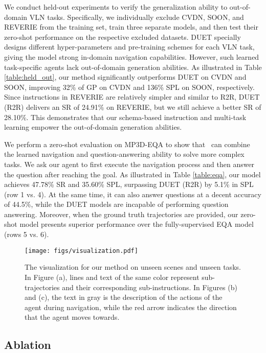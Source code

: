 We conduct held-out experiments to verify the generalization ability to out-of-domain VLN tasks. 
Specifically, we individually exclude CVDN, SOON, and REVERIE from the training set, train three separate models, and then test their zero-shot performance on the respective excluded datasets.
DUET specially designs different hyper-parameters and pre-training schemes for each VLN task, giving the model strong in-domain navigation capabilities. However, such learned task-specific agents lack out-of-domain generation abilities. As illustrated in Table \ref{table:held_out}, our method significantly outperforms DUET on CVDN and SOON, improving 32\% of GP on CVDN and 136\% SPL on SOON, respectively. Since instructions in REVERIE are relatively simpler and similar to R2R, DUET (R2R) delivers an SR of 24.91\% on REVERIE, but we still achieve a better SR of 28.10\%. 
This demonstrates that our schema-based instruction and multi-task learning empower the out-of-domain generation abilities.


We perform a zero-shot evaluation on MP3D-EQA to show that \modelname~can combine the learned navigation and question-answering ability to solve more complex tasks. 
We ask our agent to first execute the navigation process and then answer the question after reaching the goal.
As illustrated in Table \ref{table:eqa}, our model achieves 47.78\% SR and 35.60\% SPL, surpassing DUET (R2R) by 5.1\% in SPL (row 1 vs. 4).
At the same time, it can also answer questions at a decent accuracy of 44.5\%, while the DUET models are incapable of performing question answering.
Moreover, when the ground truth trajectories are provided, our zero-shot model presents superior performance over the fully-supervised EQA model (rows 5 vs. 6).


\begin{figure*}[t] \centering \texttt{[image: figs/visualization.pdf]} \caption{The visualization for our method on unseen scenes and unseen tasks.
In Figure (a), lines and text of the same color represent sub-trajectories and their corresponding sub-instructions.
In Figures (b) and (c), the text in gray is the description of the actions of the agent during navigation, while the red arrow indicates the direction that the agent moves towards.}
\label{fig:visulaiaztion}
\end{figure*}


\subsection{Ablation}
\label{sec:ablation}


